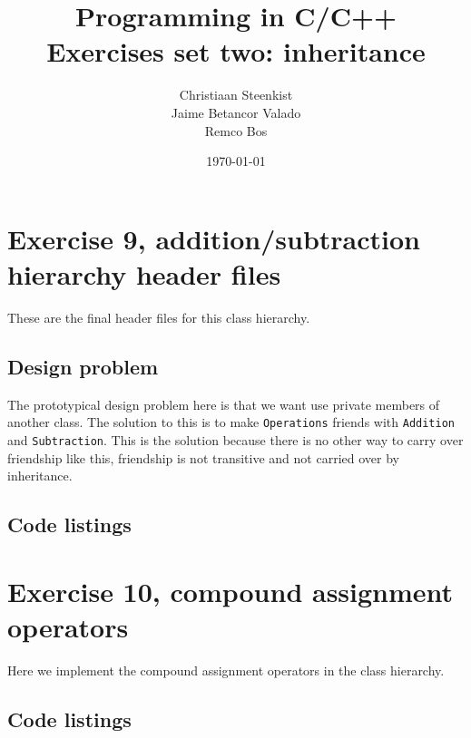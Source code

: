 \documentclass[11pt]{article}
\begin{document}
\title{Programming in C/C++ \\
       Exercises set two: inheritance
}
\date{\today}
\author{Christiaan Steenkist \\
Jaime Betancor Valado \\
Remco Bos \\
}

\maketitle
\section*{Exercise 9, addition/subtraction hierarchy header files}
These are the final header files for this class hierarchy.

\subsection*{Design problem}
The prototypical design problem here is that we want use private members of another class.
The solution to this is to make \texttt{Operations} friends with \texttt{Addition} and \texttt{Subtraction}.
This is the solution because there is no other way to carry over friendship like this, friendship is not transitive and not carried over by inheritance.

\subsection*{Code listings}









\section*{Exercise 10, compound assignment operators}
Here we implement the compound assignment operators in the class hierarchy.

\subsection*{Code listings}


\end{document}
